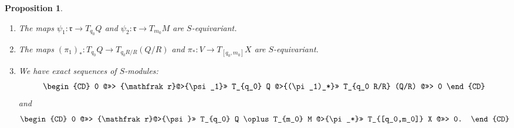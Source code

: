 \documentclass[11pt,letterpaper,reqno]{amsart}
\newcommand{\fr}{{\mathfrak r}}
\numberwithin{equation}{section}
\theoremstyle{plain}
\newtheorem{proposition}[theorem]{Proposition}
\theoremstyle{definition}
\theoremstyle{remark}
\begin{document}
\begin{proposition} \label{p:exact}
\begin{enumerate}
\item The maps $\psi_1: \fr \to T_{q_0} Q$ and $\psi_2: \fr \to T_{m_0}M$ are $S$-equivariant.
\item The maps $(\pi_1)_*: T_{q_0} Q \to T_{q_0 R/R} (Q/R)$ and $\pi_*: V \to T_{[q_0, m_0]} X$ are $S$-equivariant.
\item We have exact sequences of $S$-modules:
\begin{equation} \label{e:exact1}
\begin{CD}
0 @>>> \fr @>{\psi_1}>> T_{q_0} Q @>{(\pi_1)_*}>> T_{q_0 R/R} (Q/R) @>>> 0
\end{CD}
\end{equation}
and
\begin{equation} \label{e:exact2}
\begin{CD}
0 @>>> \fr @>{\psi}>> T_{q_0} Q \oplus T_{m_0} M @>{\pi_*}>> T_{[q_0,m_0]} X @>>> 0.
\end{CD}
\end{equation}
\end{enumerate}
\end{proposition}
\end{document}
